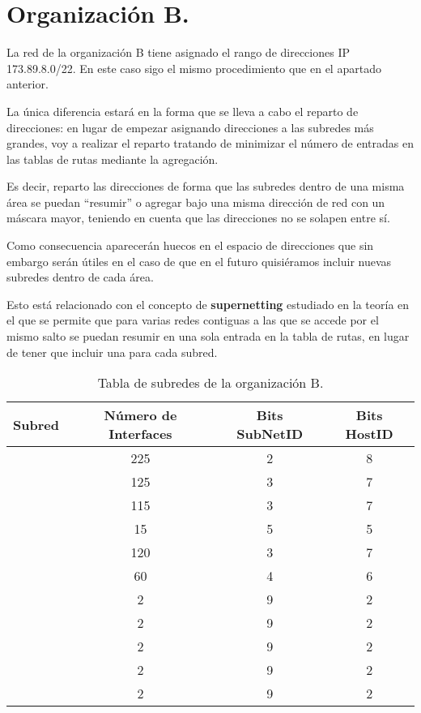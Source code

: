 	
\section{Organización B.}

\par La red de la organización B tiene asignado el rango de direcciones IP 173.89.8.0/22. En este caso sigo el mismo procedimiento que en el apartado anterior.
\par La única diferencia estará en la forma que se lleva a cabo el reparto de direcciones: en lugar de empezar asignando direcciones a las subredes más grandes, voy a realizar el reparto tratando de minimizar el número de entradas en las tablas de rutas mediante la agregación.
\par Es decir, reparto las direcciones de forma que las subredes dentro de una misma área se puedan ``resumir'' o agregar bajo una misma dirección de red con un máscara mayor, teniendo en cuenta que las direcciones no se solapen entre sí.
\par Como consecuencia aparecerán huecos en el espacio de direcciones que sin embargo serán útiles en el caso de que en el futuro quisiéramos incluir nuevas subredes dentro de cada área.
\par Esto está relacionado con el concepto de \textbf{supernetting} estudiado en la teoría en el que se permite que para varias redes contiguas a las que se accede por el mismo salto se puedan resumir en una sola entrada en la tabla de rutas, en lugar de tener que incluir una para cada subred.
\begin{table}[H]
    \centering
    \begin{tabular}{|c|c|c|c|}
        \hline
       	Subred&Número de Interfaces&Bits SubNetID&Bits HostID\\\hline
	\cellcolor{rojo}{LAN2.0}&225&2&8 \\ \hline
	\cellcolor{naranja}{LAN2.1}&125&3&7 \\ \hline
	\cellcolor{lila}{LAN2.2}&115&3&7 \\ \hline
	\cellcolor{rosa}{LAN2.3}&15&5&5 \\ \hline
	\cellcolor{amarillo}{LAN2.4}&120&3&7 \\ \hline
	\cellcolor{azul}{LAN2.5}&60&4&6 \\ \hline
	\cellcolor{verde}{P2P2.0}&2&9&2 \\ \hline
	\cellcolor{verde}{P2P2.1}&2&9&2 \\ \hline
	\cellcolor{verde}{P2P2.2}&2&9&2 \\ \hline
	\cellcolor{verde}{P2P2.3}&2&9&2 \\ \hline
	\cellcolor{verde}{P2P2.4}&2&9&2 \\ \hline
    \end{tabular}
    \caption{Tabla de subredes de la organización B.}
    \label{tab:orgB.1}
\end{table}
